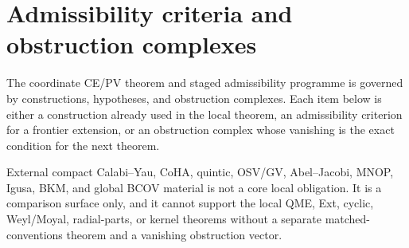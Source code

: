 \section{Admissibility criteria and obstruction complexes}\label{sec:open-obligations}

The coordinate CE/PV theorem and staged admissibility programme is
governed by constructions, hypotheses, and obstruction complexes.  Each
item below is either a construction already used in the local theorem, an
admissibility criterion for a frontier extension, or an obstruction complex
whose vanishing is the exact condition for the next theorem.

External compact Calabi--Yau, CoHA, quintic, OSV/GV, Abel--Jacobi, MNOP,
Igusa, BKM, and global BCOV material is not a core local obligation.  It
is a comparison surface only, and it cannot support the local QME, Ext,
cyclic, Weyl/Moyal, radial-parts, or kernel theorems without a separate
matched-conventions theorem and a vanishing obstruction vector.

